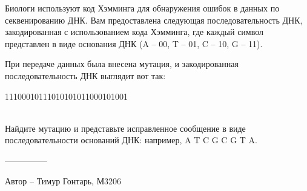 \question
Биологи используют код Хэмминга для обнаружения ошибок в данных по секвенированию ДНК. Вам предоставлена следующая последовательность ДНК, закодированная с использованием кода Хэмминга, где каждый символ представлен в виде основания ДНК (A -- 00, T -- 01, C -- 10, G -- 11).

При передаче данных была внесена мутация, и закодированная последовательность ДНК выглядит вот так: 
\begin{center}
11100010111010101011000101001
\end{center}
\\
Найдите мутацию и представьте исправленное сообщение в виде последовательности оснований ДНК: например, A T C G C G T A.

---------------

Автор -- Тимур Гонтарь, М3206